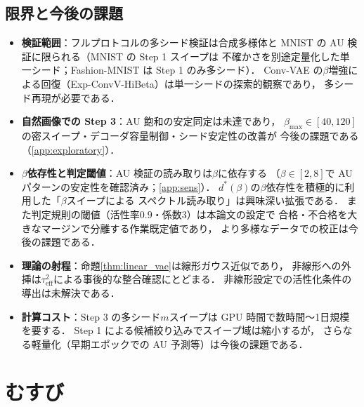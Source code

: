 \documentclass[11pt,a4paper]{jsarticle}
\newcommand{\dstar}{d^{*}(\beta)}
\begin{document}
\subsection{限界と今後の課題}\label{sec:disc_limitation}

\begin{itemize}
  \item \textbf{検証範囲}：フルプロトコルの多シード検証は合成多様体と
        MNIST の AU 検証に限られる（MNIST の Step 1 スイープは
        不確かさを別途定量化した単一シード；Fashion-MNIST は Step 1 のみ多シード）．
        Conv-VAE の$\beta$増強による回復（Exp-ConvV-HiBeta）は単一シードの探索的観察であり，
        多シード再現が必要である．
  \item \textbf{自然画像での Step 3}：AU 飽和の安定同定は未達であり，
        $\beta_{\max} \in [40, 120]$の密スイープ・デコーダ容量制御・シード安定性の改善が
        今後の課題である（\ref{app:exploratory}）．
  \item \textbf{$\beta$依存性と判定閾値}：AU 検証の読み取りは$\beta$に依存する
        （$\beta \in [2, 8]$で AU パターンの安定性を確認済み；\ref{app:sens}）．
        $\dstar$の$\beta$依存性を積極的に利用した「$\beta$スイープによる
        スペクトル読み取り」は興味深い拡張である．
        また判定規則の閾値（活性率$0.9$・係数$3$）は本論文の設定で
        合格・不合格を大きなマージンで分離する作業既定値であり，
        より多様なデータでの校正は今後の課題である．
  \item \textbf{理論の射程}：命題\ref{thm:linear_vae}は線形ガウス近似であり，
        非線形への外挿は$\tau^2_{\mathrm{eff}}$による事後的な整合確認にとどまる．
        非線形設定での活性化条件の導出は未解決である．
  \item \textbf{計算コスト}：Step 3 の多シード$m$スイープは GPU 時間で数時間〜1日規模を要する．
        Step 1 による候補絞り込みでスイープ域は縮小するが，
        さらなる軽量化（早期エポックでの AU 予測等）は今後の課題である．
\end{itemize}

\section{むすび}\label{sec:conclusion}
\end{document}
